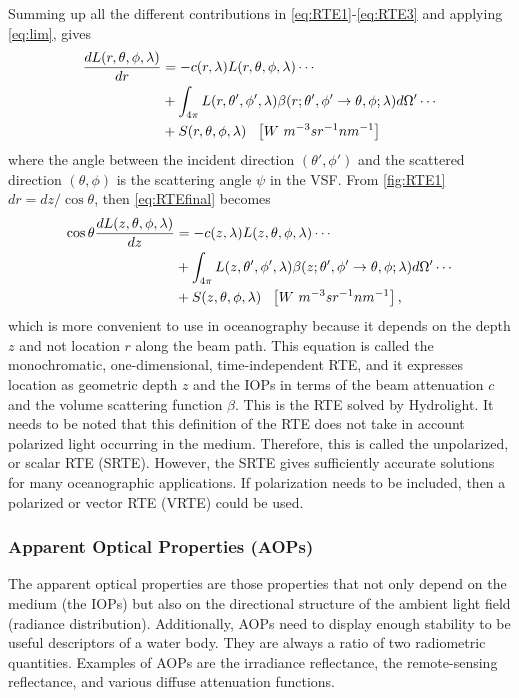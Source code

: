 Summing up all the different contributions in \autoref{eq:RTE1}-\ref{eq:RTE3} and applying \autoref{eq:lim}, gives
\begin{align}\label{eq:RTEfinal}
  \frac{dL(r,\theta,\phi,\lambda)}{dr}&=-c(r,\lambda)L(r,\theta,\phi,\lambda)\cdots \notag \\
  &+\int_{4\pi} L(r,\theta',\phi',\lambda)\beta(r;\theta',\phi' \to \theta,\phi;\lambda)d\Omega'\cdots \notag  \\
  &+S(r,\theta,\phi,\lambda)~~\left[W~m^{-3}sr^{-1}nm^{-1} \right]
\end{align}
where the angle between the incident direction $(\theta',\phi')$ and the scattered direction $(\theta,\phi)$ is the scattering angle $\psi$ in the VSF. From \autoref{fig:RTE1} $dr=dz/\cos{\theta}$, then \autoref{eq:RTEfinal} becomes
\begin{align}\label{eq:RTEfinal2}
  \cos\theta\frac{dL(z,\theta,\phi,\lambda)}{dz}&=-c(z,\lambda)L(z,\theta,\phi,\lambda)\cdots \notag \\
  &+\int_{4\pi} L(z,\theta',\phi',\lambda)\beta(z;\theta',\phi' \to \theta,\phi;\lambda)d\Omega'\cdots \notag  \\
  &+S(z,\theta,\phi,\lambda)~~\left[W~m^{-3}sr^{-1}nm^{-1} \right],
\end{align}
which is more convenient to use in oceanography because it depends on the depth $z$ and not location $r$ along the beam path. This equation is called the monochromatic, one-dimensional, time-independent RTE, and it expresses location as geometric depth $z$ and the IOPs in terms of the beam attenuation $c$ and the volume scattering function $\beta$. This is the RTE solved by Hydrolight. It needs to be noted that this definition of the RTE does not take in account polarized light occurring in the medium. Therefore, this is called the unpolarized, or scalar RTE (SRTE). However, the SRTE gives sufficiently accurate solutions for many oceanographic applications. If polarization needs to be included, then a polarized or vector RTE (VRTE) could be used.

\subsubsection*{Apparent Optical Properties (AOPs)}
The apparent optical properties are those properties that not only depend on the medium (the IOPs) but also on the directional structure of the ambient light field (radiance distribution). Additionally, AOPs need to display enough stability to be useful descriptors of a water body. They are always a ratio of two radiometric quantities. Examples of AOPs are the irradiance reflectance, the remote-sensing reflectance, and various diffuse attenuation functions.

